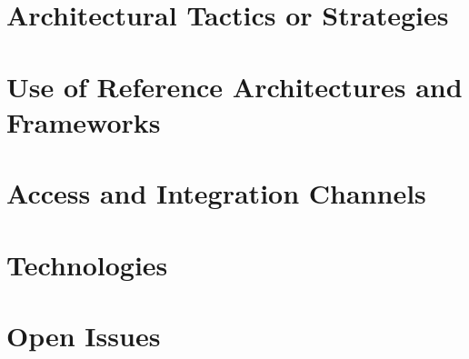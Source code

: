 \documentclass[a4paper,12pt]{article}
\begin{document}
\section{Architectural Tactics or Strategies}

\section{Use of Reference Architectures and Frameworks}

\section{Access and Integration Channels}

\section{Technologies}

\newpage
\section{Open Issues}
\end{document}

